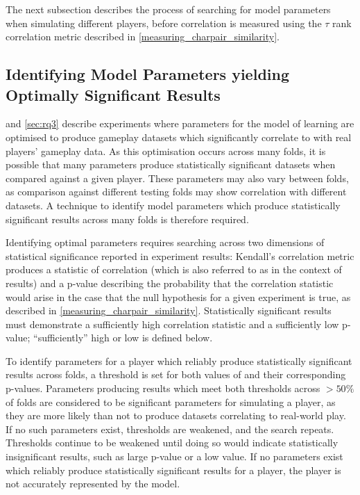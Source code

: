 The next subsection describes the process of searching for model parameters when
simulating different players, before correlation is measured using the $\tau$
rank correlation metric described in \cref{measuring_charpair_similarity}.



\subsection{Identifying Model Parameters yielding Optimally Significant Results}
\label{identifying-significant-results-explanation}

 and \cref{sec:rq3} describe experiments where parameters for the
model of learning are optimised to produce gameplay datasets which significantly
correlate to with real players' gameplay data. As this optimisation occurs
across many folds, it is possible that many parameters produce statistically
significant datasets when compared against a given player. These parameters may
also vary between folds, as comparison against different testing folds may show
correlation with different datasets. A technique to identify model parameters
which produce statistically significant results across many folds is therefore
required.

Identifying optimal parameters requires searching across two dimensions of
statistical significance reported in experiment results: Kendall's \tau{}
correlation metric produces a statistic of correlation (which is also referred
to as \tau{} in the context of results) and a p-value describing the probability
that the correlation statistic would arise in the case that the null hypothesis
for a given experiment is true, as described in
\cref{measuring_charpair_similarity}. Statistically significant results must
demonstrate a sufficiently high correlation statistic and a sufficiently low
p-value; ``sufficiently'' high or low is defined below.

To identify parameters for a player which reliably produce statistically
significant results across folds, a threshold is set for both values of \tau{}
and their corresponding p-values. Parameters producing results which meet both
thresholds across $>50\%$ of folds are considered to be significant
parameters for simulating a player, as they are more likely than not to produce
datasets correlating to real-world play. If no such parameters exist,
thresholds are weakened, and the search repeats. Thresholds continue to be
weakened until doing so would indicate statistically insignificant results, such
as large p-value or a low \tau{} value. If no parameters exist which reliably
produce statistically significant results for a player, the player is not
accurately represented by the model.


